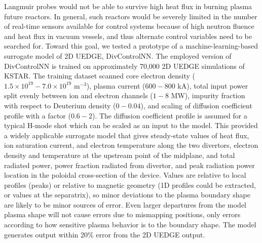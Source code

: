 Langmuir probes would not be able to survive high heat flux in burning plasma future reactors.
In general, such reactors would be severely limited in the number of real-time sensors available for control systems because of high neutron fluence and heat flux in vacuum vessels, and thus alternate control variables need to be searched for.
Toward this goal, we tested a prototype of a machine-learning-based surrogate model of 2D UEDGE, DivControlNN.
The employed version of DivControlNN is trained on approximately 70,000 2D UEDGE simulations of KSTAR.
The training dataset scanned core electron density ($1.5 \times 10^{19} - 7.0 \times 10^{19}$ m$^{-3}$), plasma current ($600-800$ kA), total input power split evenly between ion and electron channels ($1-8$ MW), impurity fraction with respect to Deuterium density ($0-0.04$), and scaling of diffusion coefficient profile with a factor ($0.6 - 2$).
The diffusion coefficient profile is assumed for a typical H-mode shot which can be scaled as an input to the model.
This provided a widely applicable surrogate model that gives steady-state values of heat flux, ion saturation current, and electron temperature along the two divertors, electron density and temperature at the upstream point of the midplane, and total radiated power, power fraction radiated from divertor, and peak radiation power location in the poloidal cross-section of the device.
Values are relative to local profiles (peaks) or relative to magnetic geometry (1D profiles could be extracted, or values at the separatrix), so minor deviations to the plasma boundary shape are likely to be minor sources of error.
Even larger departures from the model plasma shape will not cause errors due to mismapping positions, only errors according to how sensitive plasma behavior is to the boundary shape.
The model generates output within 20\% error from the 2D UEDGE output.

